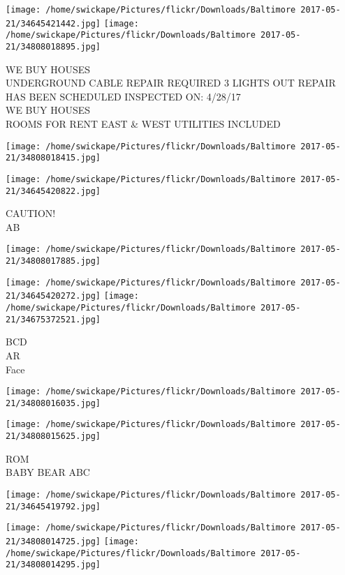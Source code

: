 \documentclass[10pt,letterpaper]{article}
\begin{document}
\texttt{[image: /home/swickape/Pictures/flickr/Downloads/Baltimore 2017-05-21/34645421442.jpg]}
\texttt{[image: /home/swickape/Pictures/flickr/Downloads/Baltimore 2017-05-21/34808018895.jpg]}

WE BUY HOUSES\\
UNDERGROUND CABLE REPAIR REQUIRED 3 LIGHTS OUT REPAIR HAS BEEN SCHEDULED INSPECTED ON: 4/28/17\\
WE BUY HOUSES\\
ROOMS FOR RENT EAST \& WEST UTILITIES INCLUDED\\
\pagebreak

\texttt{[image: /home/swickape/Pictures/flickr/Downloads/Baltimore 2017-05-21/34808018415.jpg]}

\vspace{0.25in}
\texttt{[image: /home/swickape/Pictures/flickr/Downloads/Baltimore 2017-05-21/34645420822.jpg]}

CAUTION!\\
AB\\
\pagebreak

\texttt{[image: /home/swickape/Pictures/flickr/Downloads/Baltimore 2017-05-21/34808017885.jpg]}

\vspace{0.25in}
\texttt{[image: /home/swickape/Pictures/flickr/Downloads/Baltimore 2017-05-21/34645420272.jpg]}
\texttt{[image: /home/swickape/Pictures/flickr/Downloads/Baltimore 2017-05-21/34675372521.jpg]}

BCD\\
AR\\
Face\\
\pagebreak

\texttt{[image: /home/swickape/Pictures/flickr/Downloads/Baltimore 2017-05-21/34808016035.jpg]}

\vspace{0.25in}
\texttt{[image: /home/swickape/Pictures/flickr/Downloads/Baltimore 2017-05-21/34808015625.jpg]}

ROM\\
BABY BEAR ABC\\
\pagebreak

\texttt{[image: /home/swickape/Pictures/flickr/Downloads/Baltimore 2017-05-21/34645419792.jpg]}

\vspace{0.25in}
\texttt{[image: /home/swickape/Pictures/flickr/Downloads/Baltimore 2017-05-21/34808014725.jpg]}
\texttt{[image: /home/swickape/Pictures/flickr/Downloads/Baltimore 2017-05-21/34808014295.jpg]}
\end{document}
